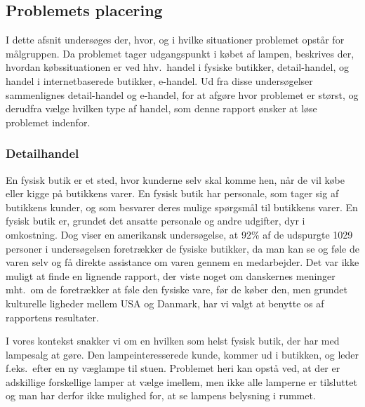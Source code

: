 \subsection{Problemets placering}
I dette afsnit undersøges der, hvor, og i hvilke situationer problemet opstår for målgruppen. Da problemet tager udgangspunkt i købet af lampen, beskrives der, hvordan købssituationen er ved hhv.\ handel i fysiske butikker, detail-handel, og handel i internetbaserede butikker, e-handel. Ud fra disse undersøgelser sammenlignes detail-handel og e-handel, for at afgøre hvor problemet er størst, og derudfra vælge hvilken type af handel, som denne rapport ønsker at løse problemet indenfor.

\subsubsection{Detailhandel}
En fysisk butik er et sted, hvor kunderne selv skal komme hen, når de vil købe eller kigge på butikkens varer. En fysisk butik har personale, som tager sig af butikkens kunder, og som besvarer deres mulige spørgsmål til butikkens varer. En fysisk butik er, grundet det ansatte personale og andre udgifter, dyr i omkostning. Dog viser en amerikansk undersøgelse, at 92\% af de udspurgte 1029 personer i undersøgelsen foretrækker de fysiske butikker, da man kan se og føle de varen selv og få direkte assistance om varen gennem en medarbejder\cite{fysisk_kontra_online}. Det var ikke muligt at finde en lignende rapport, der viste noget om danskernes meninger mht.\ om de foretrækker at føle den fysiske vare, før de køber den, men grundet kulturelle ligheder mellem USA og Danmark, har vi valgt at benytte os af rapportens resultater.

I vores kontekst snakker vi om en hvilken som helst fysisk butik, der har med lampesalg at gøre. Den lampeinteresserede kunde, kommer ud i butikken, og leder f.eks.\ efter en ny væglampe til stuen. Problemet heri kan opstå ved, at der er adskillige forskellige lamper at vælge imellem, men ikke alle lamperne er tilsluttet og man har derfor ikke mulighed for, at se lampens belysning i rummet.

